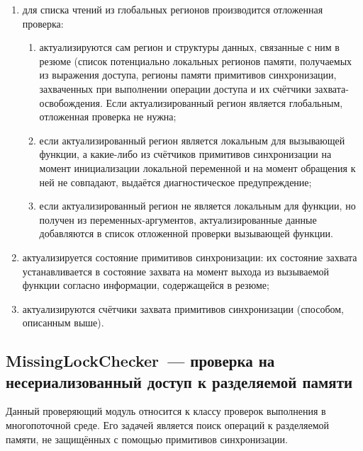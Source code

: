 \begin{enumerate}
 \item для списка чтений из глобальных регионов производится отложенная проверка:
 \begin{enumerate}
  \item актуализируются сам регион и структуры данных, связанные с ним в резюме (список потенциально локальных регионов памяти, получаемых из выражения доступа, регионы памяти примитивов синхронизации, захваченных при выполнении операции доступа и их счётчики захвата-освобождения. Если актуализированный регион является глобальным, отложенная проверка не нужна;
  \item если актуализированный регион является локальным для вызывающей функции, а какие-либо из счётчиков примитивов синхронизации на момент инициализации локальной переменной и на момент обращения к ней не совпадают, выдаётся диагностическое предупреждение;
  \item если актуализированный регион не является локальным для функции, но получен из переменных-аргументов, актуализированные данные добавляются в список отложенной проверки вызывающей функции. 
 \end{enumerate}
 \item актуализируется состояние примитивов синхронизации: их состояние захвата устанавливается в состояние захвата на момент выхода из вызываемой функции согласно информации, содержащейся в резюме;
 \item актуализируются счётчики захвата примитивов синхронизации (способом, описанным выше).
\end{enumerate}


\subsection{MissingLockChecker~--- проверка на несериализованный доступ к разделяемой памяти}

Данный проверяющий модуль относится к классу проверок выполнения в многопоточной среде. Его задачей является поиск операций  к разделяемой памяти, не защищённых с помощью примитивов синхронизации. 

